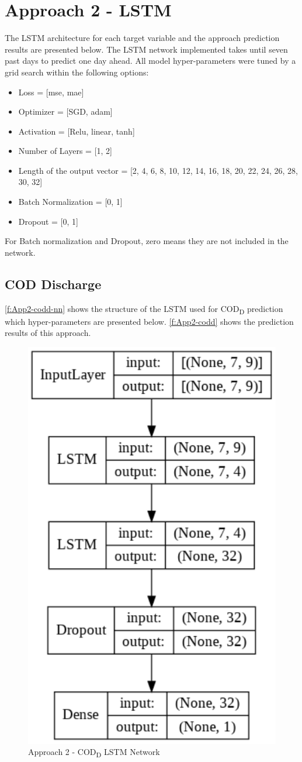 \section{Approach 2 - LSTM}
The \ac{LSTM} architecture for each target variable and the approach prediction results are presented below. The \ac{LSTM} network implemented takes until seven past days to predict one day ahead.
All model hyper-parameters were tuned by a grid search within the following options:

\begin{itemize}
    \item Loss = [mse, mae]
    \item Optimizer = [SGD, adam]
    \item Activation = [Relu, linear, tanh]
    \item Number of Layers = [1, 2]
    \item Length of the output vector = [2, 4, 6, 8, 10, 12, 14, 16, 18, 20, 22, 24, 26, 28, 30, 32]
    \item Batch Normalization = [0, 1]
    \item Dropout = [0, 1]
\end{itemize}

For Batch normalization and Dropout, zero means they are not included in the network.

\subsection{COD Discharge}
\autoref{f:App2-codd-nn} shows the structure of the \ac{LSTM} used for \ac{COD}\textsubscript{D} prediction which hyper-parameters are presented below. \autoref{f:App2-codd} shows the prediction results of this approach.

\begin{figure}[h]
\centering
 \includegraphics[width=0.4\linewidth]{figures/Ch5/App2_CODd.pdf}
\caption{Approach 2 - COD\textsubscript{D} LSTM Network}
\label{f:App2-codd-nn}
\end{figure}

